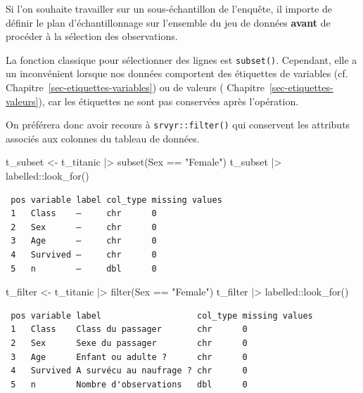 \documentclass[
  letterpaper,
  DIV=11,
  numbers=noendperiod,
  oneside]{scrreprt}
\newenvironment{Shaded}{\begin{snugshade}}{\end{snugshade}}
\newcommand{\FunctionTok}[1]{\textcolor[rgb]{0.28,0.35,0.67}{#1}}
\newcommand{\NormalTok}[1]{\textcolor[rgb]{0.00,0.23,0.31}{#1}}
\newcommand{\OtherTok}[1]{\textcolor[rgb]{0.00,0.23,0.31}{#1}}
\newcommand{\SpecialCharTok}[1]{\textcolor[rgb]{0.37,0.37,0.37}{#1}}
\newcommand{\StringTok}[1]{\textcolor[rgb]{0.13,0.47,0.30}{#1}}
\begin{document}
Si l'on souhaite travailler sur un sous-échantillon de l'enquête, il
importe de définir le plan d'échantillonnage sur l'ensemble du jeu de
données \textbf{avant} de procéder à la sélection des observations.

La fonction classique pour sélectionner des lignes est
\texttt{subset()}. Cependant, elle a un inconvénient lorsque nos données
comportent des étiquettes de variables (cf.
Chapitre~\ref{sec-etiquettes-variables}) ou de valeurs (
Chapitre~\ref{sec-etiquettes-valeurs}), car les étiquettes ne sont pas
conservées après l'opération.

On préférera donc avoir recours à \texttt{srvyr::filter()} qui
conservent les attributs associés aux colonnes du tableau de données.

\begin{Shaded}
\begin{Highlighting}[]
\NormalTok{t\_subset }\OtherTok{\textless{}{-}}\NormalTok{ t\_titanic }\SpecialCharTok{|\textgreater{}} \FunctionTok{subset}\NormalTok{(Sex }\SpecialCharTok{==} \StringTok{"Female"}\NormalTok{)}
\NormalTok{t\_subset }\SpecialCharTok{|\textgreater{}}\NormalTok{ labelled}\SpecialCharTok{::}\FunctionTok{look\_for}\NormalTok{()}
\end{Highlighting}
\end{Shaded}

\begin{verbatim}
 pos variable label col_type missing values
 1   Class    —     chr      0             
 2   Sex      —     chr      0             
 3   Age      —     chr      0             
 4   Survived —     chr      0             
 5   n        —     dbl      0             
\end{verbatim}

\begin{Shaded}
\begin{Highlighting}[]
\NormalTok{t\_filter }\OtherTok{\textless{}{-}}\NormalTok{ t\_titanic }\SpecialCharTok{|\textgreater{}} \FunctionTok{filter}\NormalTok{(Sex }\SpecialCharTok{==} \StringTok{"Female"}\NormalTok{)}
\NormalTok{t\_filter }\SpecialCharTok{|\textgreater{}}\NormalTok{ labelled}\SpecialCharTok{::}\FunctionTok{look\_for}\NormalTok{()}
\end{Highlighting}
\end{Shaded}

\begin{verbatim}
 pos variable label                   col_type missing values
 1   Class    Class du passager       chr      0             
 2   Sex      Sexe du passager        chr      0             
 3   Age      Enfant ou adulte ?      chr      0             
 4   Survived A survécu au naufrage ? chr      0             
 5   n        Nombre d'observations   dbl      0             
\end{verbatim}
\end{document}
